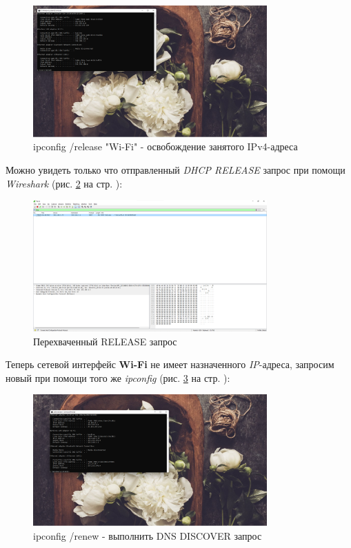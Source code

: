 \documentclass[a4paper]{article}
\begin{document}
  \begin{figure}[H]
    \centering
    \includegraphics[width=0.8\textwidth]{04_00 (4)}
    \caption{ipconfig /release "Wi-Fi" - освобождение занятого IPv4-адреса}
    \label{img:0005}
  \end{figure}

  Можно увидеть только что отправленный \textit{DHCP RELEASE} запрос при помощи \textit{Wireshark}
  (рис. \ref{img:0006} на стр. \pageref{img:0006}):

  \begin{figure}[H]
    \centering
    \includegraphics[width=0.8\textwidth]{04_00 (6)}
    \caption{Перехваченный RELEASE запрос}
    \label{img:0006}
  \end{figure}

  Теперь сетевой интерфейс \textbf{Wi-Fi} не имеет назначенного \textit{IP}-адреса,
  запросим новый при помощи того же \textit{ipconfig} (рис. \ref{img:0007} на стр. \pageref{img:0007}):

  \begin{figure}[H]
    \centering
    \includegraphics[width=0.8\textwidth]{04_00 (7)}
    \caption{ipconfig /renew - выполнить DNS DISCOVER запрос}
    \label{img:0007}
  \end{figure}
\end{document}
